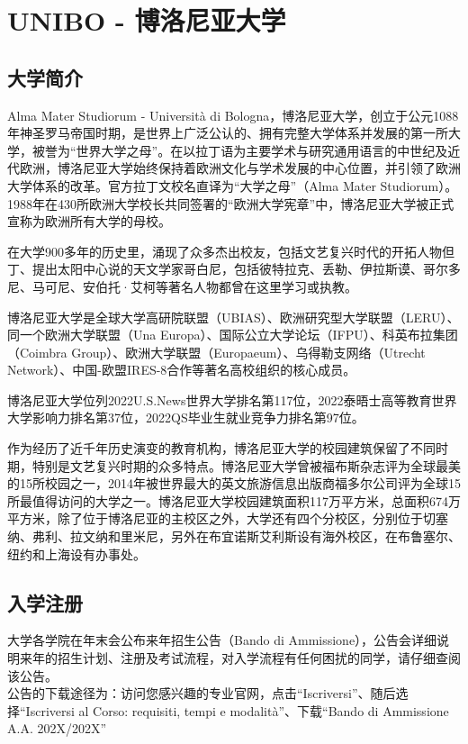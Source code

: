 \chapter{UNIBO - 博洛尼亚大学}    

\section{大学简介}
Alma Mater Studiorum - Università di Bologna，博洛尼亚大学，创立于公元1088年神圣罗马帝国时期，是世界上广泛公认的、拥有完整大学体系并发展的第一所大学，被誉为“世界大学之母”。在以拉丁语为主要学术与研究通用语言的中世纪及近代欧洲，博洛尼亚大学始终保持着欧洲文化与学术发展的中心位置，并引领了欧洲大学体系的改革。官方拉丁文校名直译为“大学之母”（Alma Mater Studiorum）。1988年在430所欧洲大学校长共同签署的“欧洲大学宪章”中，博洛尼亚大学被正式宣称为欧洲所有大学的母校。

在大学900多年的历史里，涌现了众多杰出校友，包括文艺复兴时代的开拓人物但丁、提出太阳中心说的天文学家哥白尼，包括彼特拉克、丢勒、伊拉斯谟、哥尔多尼、马可尼、安伯托·艾柯等著名人物都曾在这里学习或执教。
 
博洛尼亚大学是全球大学高研院联盟（UBIAS）、欧洲研究型大学联盟（LERU）、同一个欧洲大学联盟（Una Europa）、国际公立大学论坛（IFPU）、科英布拉集团（Coimbra Group）、欧洲大学联盟（Europaeum）、乌得勒支网络（Utrecht Network）、中国-欧盟IRES-8合作等著名高校组织的核心成员。

博洛尼亚大学位列2022U.S.News世界大学排名第117位，2022泰晤士高等教育世界大学影响力排名第37位，2022QS毕业生就业竞争力排名第97位。

作为经历了近千年历史演变的教育机构，博洛尼亚大学的校园建筑保留了不同时期，特别是文艺复兴时期的众多特点。博洛尼亚大学曾被福布斯杂志评为全球最美的15所校园之一，2014年被世界最大的英文旅游信息出版商福多尔公司评为全球15所最值得访问的大学之一。博洛尼亚大学校园建筑面积117万平方米，总面积674万平方米，除了位于博洛尼亚的主校区之外，大学还有四个分校区，分别位于切塞纳、弗利、拉文纳和里米尼，另外在布宜诺斯艾利斯设有海外校区，在布鲁塞尔、纽约和上海设有办事处。

\section{入学注册}         

大学各学院在年末会公布来年招生公告（Bando di Ammissione），公告会详细说明来年的招生计划、注册及考试流程，对入学流程有任何困扰的同学，请仔细查阅该公告。\\
公告的下载途径为：访问您感兴趣的专业官网，点击“Iscriversi”、随后选择“Iscriversi al Corso: requisiti, tempi e modalità”、下载“Bando di Ammissione A.A. 202X/202X”

